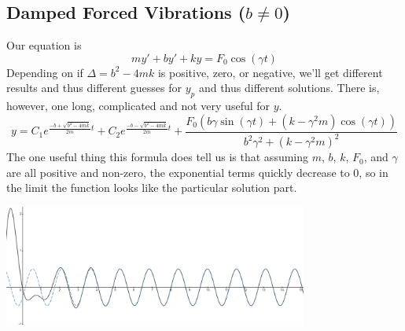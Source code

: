 \subsection{Damped Forced Vibrations ($b \neq 0$)}
\noindent
Our equation is 
\begin{equation*}
	my' + by' + ky = F_0\cos{(\gamma t)}
\end{equation*}
Depending on if $\Delta = b^2 - 4mk$ is positive, zero, or negative, we'll get different results and thus different guesses for $y_p$ and thus different solutions. There is, however, one long, complicated and not very useful for $y$.
\begin{equation*}
	y = C_1e^{\frac{-b+\sqrt{b^2-4mk}}{2m}t} + C_2e^{\frac{-b-\sqrt{b^2-4mk}}{2m}t} +
	 \frac{F_0\left(b\gamma\sin{(\gamma t)} + \left(k-\gamma^2m\right)\cos{(\gamma t)}\right)}{b^2\gamma^2 + (k-\gamma^2m)^2}
\end{equation*}
The one useful thing this formula does tell us is that assuming $m$, $b$, $k$, $F_0$, and $\gamma$ are all positive and non-zero, the exponential terms quickly decrease to 0, so in the limit the function looks like the particular solution part.

\begin{center}
	\includegraphics[width=0.75\textwidth]{./higherOrder/forcedVibrs/damped_forced.png}
\end{center}

